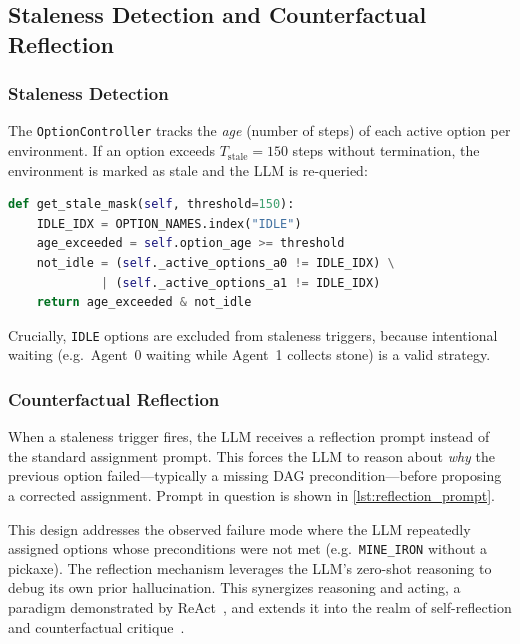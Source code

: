 \subsection{Staleness Detection and Counterfactual Reflection}
\label{sec:staleness}

\subsubsection{Staleness Detection}

The \texttt{OptionController} tracks the \emph{age} (number of steps)
of each active option per environment. If an option exceeds
$T_{\text{stale}}=150$ steps without termination, the environment
is marked as stale and the LLM is re-queried:

\begin{lstlisting}[style=code, language=Python, caption={Staleness detection in \texttt{option\_controller.py}.}, label={lst:stale_detect}]
def get_stale_mask(self, threshold=150):
    IDLE_IDX = OPTION_NAMES.index("IDLE")
    age_exceeded = self.option_age >= threshold
    not_idle = (self._active_options_a0 != IDLE_IDX) \
             | (self._active_options_a1 != IDLE_IDX)
    return age_exceeded & not_idle
\end{lstlisting}

Crucially, \texttt{IDLE} options are excluded from staleness triggers,
because intentional waiting (e.g.\ Agent~0 waiting while Agent~1
collects stone) is a valid strategy.

\subsubsection{Counterfactual Reflection}

When a staleness trigger fires, the LLM receives a reflection prompt
instead of the standard assignment prompt. This forces the LLM to
reason about \emph{why} the previous option failed—typically a missing
DAG precondition—before proposing a corrected assignment. Prompt in question is shown in \cref{lst:reflection_prompt}.

\medskip

This design addresses the observed failure mode where the LLM
repeatedly assigned options whose preconditions were not met (e.g.\
\texttt{MINE\_IRON} without a pickaxe). The reflection mechanism
leverages the LLM's zero-shot reasoning to debug its own prior
hallucination. This synergizes reasoning and acting, a paradigm demonstrated by ReAct~\parencite{Yao_Zhao_Yu_Du_Shafran_Narasimhan_Cao_2023}, and extends it into the realm of self-reflection and counterfactual critique~\parencite{Shinn_Cassano_Berman_Gopinath_Narasimhan_Yao_2023}.

